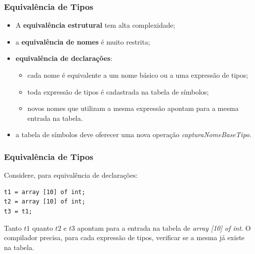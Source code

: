 \documentclass[table]{beamer}
\begin{document}
\begin{frame}
   \frametitle{Equivalência de Tipos}
   \begin{itemize}
      \item A \textbf{equivalência estrutural} tem alta complexidade;
      \item a \textbf{equivalência de nomes} é muito restrita;
      \item \textbf{equivalência de declarações}:
      \begin{itemize}
         \item cada nome é equivalente a um nome básico ou a uma expressão de tipos;
	 \item toda expressão de tipos é cadastrada na tabela de símbolos;
	 \item novos nomes que utilizam a mesma expressão apontam para a mesma entrada na tabela.
      \end{itemize}
      \item a tabela de símbolos deve oferecer uma nova operação \textit{capturaNomeBaseTipo}.
   \end{itemize}
\end{frame}

\begin{frame}[fragile]
   \frametitle{Equivalência de Tipos}
   Considere, para equivalência de declarações:
   \begin{verbatim}
t1 = array [10] of int;
t2 = array [10] of int;
t3 = t1;
   \end{verbatim}
   Tanto $t1$ quanto $t2$ e $t3$ apontam para a entrada na tabela de \textit{array [10] of int}. O compilador precisa, para cada expressão de tipos, verificar se a mesma já existe na tabela.
\end{frame}
\end{document}

